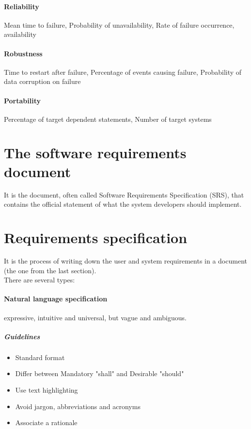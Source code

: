 \documentclass[a4paper,11pt,twocolumn]{report}
\begin{document}
    \paragraph{Reliability} Mean time to failure, Probability of
    unavailability, Rate of failure occurrence, availability
    \paragraph{Robustness} Time to restart after failure, Percentage of events
    causing failure, Probability of data corruption on failure
    \paragraph{Portability} Percentage of target dependent statements, Number
    of target systems
    \section{The software requirements document}
    It is the document, often called Software Requirements Specification (SRS),
    that contains the official statement of what the system developers should
    implement. 
    \section{Requirements specification}
    It is the process of writing down the user and system requirements in a
    document (the one from the last section).\\
    There are several types:
    \paragraph{Natural language specification} expressive, intuitive and
    universal, but vague and ambiguous.
    \subparagraph{Guidelines}
    \begin{itemize}
        \item Standard format
        \item Differ between Mandatory "shall" and Desirable "should"
        \item Use text highlighting
        \item Avoid jargon, abbreviations and acronyms
        \item Associate a rationale
    \end{itemize}
\end{document}
